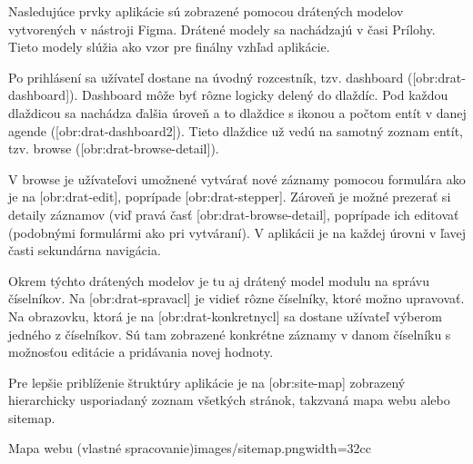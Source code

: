 Nasledujúce prvky aplikácie sú zobrazené pomocou drátených modelov vytvorených v nástroji Figma. Drátené modely sa nachádzajú v časi Prílohy. Tieto modely slúžia ako vzor pre finálny vzhľad aplikácie.

Po prihlásení sa užívateľ dostane na úvodný rozcestník, tzv. dashboard ([obr:drat-dashboard]). Dashboard môže byť rôzne logicky delený do dlaždíc. Pod každou dlaždicou sa nachádza ďalšia úroveň a to dlaždice s ikonou a počtom entít v danej agende ([obr:drat-dashboard2]). Tieto dlaždice už vedú na samotný zoznam entít, tzv. browse ([obr:drat-browse-detail]).


%

%
%

V browse je užívateľovi umožnené vytvárať nové záznamy pomocou formulára ako je na [obr:drat-edit], poprípade [obr:drat-stepper]. Zároveň je možné prezerať si detaily záznamov (viď pravá časť [obr:drat-browse-detail], poprípade ich editovať (podobnými formulármi ako pri vytváraní). V aplikácii je na každej úrovni v ľavej časti sekundárna navigácia.

Okrem týchto drátených modelov je tu aj drátený model modulu na správu číselníkov. Na [obr:drat-spravacl] je vidieť rôzne číselníky, ktoré možno upravovať. Na obrazovku, ktorá je na [obr:drat-konkretnycl] sa dostane užívateľ výberom jedného z číselníkov. Sú tam zobrazené konkrétne záznamy v danom číselníku s možnosťou editácie a pridávania novej hodnoty.

\blank
Pre lepšie priblíženie štruktúry aplikácie je na [obr:site-map] zobrazený hierarchicky usporiadaný zoznam všetkých stránok, takzvaná mapa webu alebo sitemap.

{Mapa webu (vlastné spracovanie)}{images/sitemap.png}{width=32cc} 


